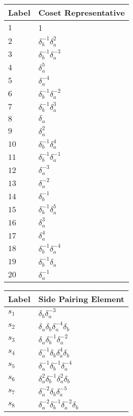 \documentclass{article}
\begin{document}
\begin{center}
\begin{tabular}{ll}
\toprule
Label & Coset Representative\\
\midrule
$1$ & 1 \\
$2$ & $\delta_b^{-1}\delta_a^{2}$ \\
$3$ & $\delta_b^{-1}\delta_a^{-3}$ \\
$4$ & $\delta_a^{5}$ \\
$5$ & $\delta_a^{-4}$ \\
$6$ & $\delta_b^{-1}\delta_a^{-2}$ \\
$7$ & $\delta_b^{-1}\delta_a^{3}$ \\
$8$ & $\delta_a^{}$ \\
$9$ & $\delta_a^{2}$ \\
$10$ & $\delta_b^{-1}\delta_a^{4}$ \\
$11$ & $\delta_b^{-1}\delta_a^{-1}$ \\
$12$ & $\delta_a^{-3}$ \\
$13$ & $\delta_a^{-2}$ \\
$14$ & $\delta_b^{-1}$ \\
$15$ & $\delta_b^{-1}\delta_a^{5}$ \\
$16$ & $\delta_a^{3}$ \\
$17$ & $\delta_a^{4}$ \\
$18$ & $\delta_b^{-1}\delta_a^{-4}$ \\
$19$ & $\delta_b^{-1}\delta_a^{}$ \\
$20$ & $\delta_a^{-1}$ \\
\bottomrule
\end{tabular}
\hfill
\begin{tabular}{ll}
\toprule
Label & Side Pairing Element\\
\midrule
$s_{1}$ & $\delta_b^{}\delta_a^{-3}$ \\
$s_{2}$ & $\delta_a^{}\delta_b^{}\delta_a^{-4}\delta_b^{}$ \\
$s_{3}$ & $\delta_a^{}\delta_b^{-1}\delta_a^{-2}$ \\
$s_{4}$ & $\delta_a^{-1}\delta_b^{}\delta_a^{4}\delta_b^{}$ \\
$s_{5}$ & $\delta_a^{-1}\delta_b^{-1}\delta_a^{-4}$ \\
$s_{6}$ & $\delta_a^{2}\delta_b^{-1}\delta_a^{2}\delta_b^{}$ \\
$s_{7}$ & $\delta_a^{-2}\delta_b^{}\delta_a^{-5}$ \\
$s_{8}$ & $\delta_a^{-2}\delta_b^{-1}\delta_a^{-2}\delta_b^{}$ \\

\end{tabular}
\end{center}
\end{document}
